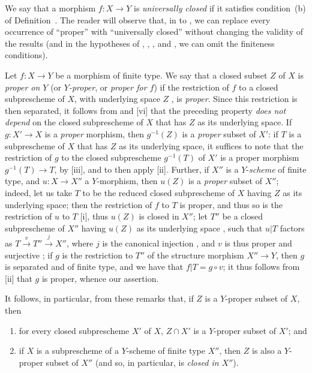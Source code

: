 \begin{rmk}[5.4.9]
\label{2.5.4.9}
We say that a morphism $f:X\to Y$ is \emph{universally closed} if it satisfies condition~(b) of Definition~.
The reader will observe that,
in  to , we can replace every occurrence of ``proper'' with ``universally closed'' without changing the validity of the results (and in the hypotheses of , , , and , we can omit the finiteness conditions).
\end{rmk}

\begin{env}[5.4.10]
\label{2.5.4.10}
Let $f:X\to Y$ be a morphism of finite type.
We say that a closed subset $Z$ of $X$ is \emph{proper on $Y$} (or \emph{$Y$-proper}, or \emph{proper for $f$}) if the restriction of $f$ to a closed subprescheme of $X$, with underlying space $Z$ , is \emph{proper}.
Since this restriction is then separated, it follows from  and [vi] that the preceding property \emph{does not depend} on the closed subprescheme of $X$ that has $Z$ as its underlying space.
If $g:X'\to X$ is a \emph{proper} morphism, then $g^{-1}(Z)$ is a \emph{proper} subset of $X'$:
if $T$ is a subprescheme of $X$ that has $Z$ as its underlying space, it suffices to note that the restriction of $g$ to the closed subprescheme $g^{-1}(T)$ of $X'$ is a proper morphism $g^{-1}(T)\to T$, by [iii], and to then apply [ii].
Further, if $X''$ is a $Y$-\emph{scheme} of finite type, and $u:X\to X''$ a $Y$-morphism, then $u(Z)$ is a \emph{proper} subset of $X''$;
indeed, let us take $T$ to be the reduced closed subprescheme of $X$ having $Z$ as its underlying space;
then the restriction of $f$ to $T$ is proper, and thus so is the restriction of $u$ to $T$ [i], thus $u(Z)$ is closed in $X''$;
let $T''$ be a closed subprescheme of $X''$ having $u(Z)$ as its underlying space , such that $u|T$ factors as $T\xrightarrow{v}T''\xrightarrow{j}X''$, where $j$ is the canonical injection , and $v$ is thus proper and surjective ;
if $g$ is the restriction to $T''$ of the structure morphism $X''\to Y$, then $g$ is separated and of finite type, and we have that $f|T=g\circ v$;
it thus follows from [ii] that $g$ is proper, whence our assertion.
\end{env}

It follows, in particular, from these remarks that, if $Z$ is a $Y$-proper subset of $X$, then
\begin{enumerate}
  \item for every closed subprescheme $X'$ of $X$, $Z\cap X'$ is a $Y$-proper subset of $X'$; and
  \item if $X$ is a subprescheme of a $Y$-scheme of finite type $X''$, then $Z$ is also a $Y$-proper subset of $X''$ (and so, in particular, is \emph{closed in $X''$}).
\end{enumerate}

